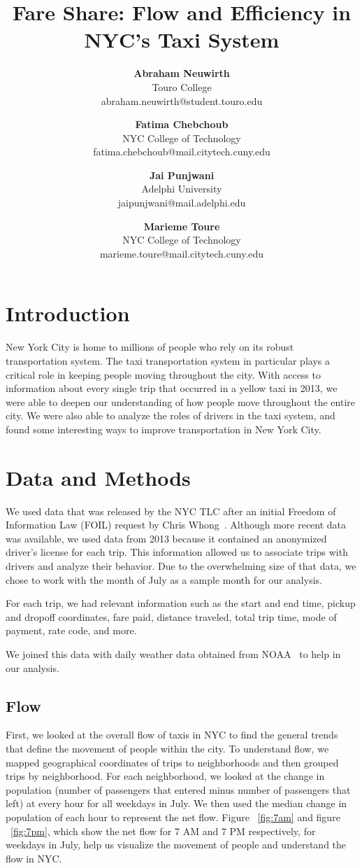 \documentclass[twocolumn]{article}
\title{Fare Share: Flow and Efficiency in NYC's Taxi System}
\author{
\normalsize{\textbf{Abraham Neuwirth}}\\ 
\small Touro College \\ 
\small abraham.neuwirth@student.touro.edu
\and 
\normalsize{\textbf{Fatima Chebchoub}}\\ 
\small NYC College of Technology\\ 
\small fatima.chebchoub@mail.citytech.cuny.edu 
\and 
\normalsize{\textbf{Jai Punjwani}}\\
\small Adelphi University\\
\small jaipunjwani@mail.adelphi.edu 
\and 
\normalsize{\textbf{Marieme Toure}}\\ 
\small NYC College of Technology\\ 
\small marieme.toure@mail.citytech.cuny.edu
}
\date{\vspace{-5ex}}
\begin{document}
\twocolumn[
\begin{@twocolumnfalse}
\maketitle

\end{@twocolumnfalse}
]
\section{Introduction}
New York City is home to millions of people who rely on its robust transportation system. The taxi transportation system in particular plays a critical role in keeping people moving throughout the city. With access to information about every single trip that occurred in a yellow taxi in 2013, we were able to deepen our understanding of how people move throughout the entire city. We were also able to analyze the roles of drivers in the taxi system, and found some interesting ways to improve transportation in New York City. 
\\


\section{Data and Methods}
We used data that was released by the NYC TLC after an initial Freedom of Information Law (FOIL) request by Chris Whong~\cite{Whong:2014}. Although more recent data was available, we used data from 2013 because it contained an anonymized driver’s license for each trip. This information allowed us to associate trips with drivers and analyze their behavior. Due to the overwhelming size of that data, we chose to work with the month of July as a sample month for our analysis.

For each trip, we had relevant information such as the start and end time, pickup and dropoff coordinates, fare paid, distance traveled, total trip time, mode of payment, rate code, and more.

We joined this data with daily weather data obtained from NOAA~\cite{NOAA:2016} to help in our analysis. 
\subsection{Flow}
First, we looked at the overall flow of taxis in NYC to find the general trends that define the movement of people within the city. To understand flow, we mapped geographical coordinates of trips to neighborhoods and then grouped trips by neighborhood. For each neighborhood, we looked at the change in population (number of passengers that entered minus number of passengers that left) at every hour for all weekdays in July. We then used the median change in population of each hour to represent the net flow. Figure ~\ref{fig:7am} and figure ~\ref{fig:7pm}, which show the net flow for 7 AM and 7 PM respectively, for weekdays in July, help us visualize the movement of people and understand the flow in NYC.
\end{document}
